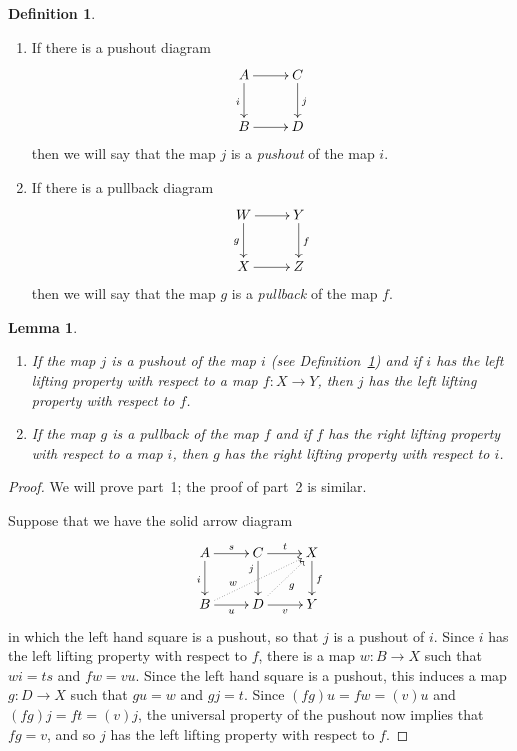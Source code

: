\documentclass[12pt]{amsart}
\numberwithin{equation}{section}
\theoremstyle{slplain}
\newtheorem{lem}[equation]{Lemma}
\theoremstyle{definition}
\newtheorem{defn}[equation]{Definition} %
\theoremstyle{remark}
\newcommand{\defref}{Definition~\ref}
\begin{document}
\begin{defn}
  \label{def:pushout}
  \leavevmode
  \begin{enumerate}
  \item If there is a pushout diagram
    \begin{displaymath}
      \xymatrix{
        {A} \ar[r] \ar[d]_{i}
        & {C} \ar[d]^{j}\\
        {B} \ar[r]
        & {D}
      }
    \end{displaymath}
    then we will say that the map $j$ is a \emph{pushout} of the map
    $i$.
  \item If there is a pullback diagram
    \begin{displaymath}
      \xymatrix{
        {W} \ar[r] \ar[d]_{g}
        & {Y} \ar[d]^{f}\\
        {X} \ar[r]
        & {Z}
      }
    \end{displaymath}
    then we will say that the map $g$ is a \emph{pullback} of the map
    $f$.
  \end{enumerate}
\end{defn}

\begin{lem}
  \label{lem:pushLLP}
  \leavevmode
  \begin{enumerate}
  \item If the map $j$ is a pushout of the map $i$ (see
    \defref{def:pushout}) and if $i$ has the left lifting property
    with respect to a map $f\colon X \to Y$, then $j$ has the left
    lifting property with respect to $f$.
  \item If the map $g$ is a pullback of the map $f$ and if $f$ has the
    right lifting property with respect to a map $i$, then $g$ has the
    right lifting property with respect to $i$.
  \end{enumerate}
\end{lem}

\begin{proof}
  We will prove part~1; the proof of part~2 is similar.

  Suppose that we have the solid arrow diagram
  \begin{displaymath}
    \xymatrix{
      {A} \ar[r]^{s} \ar[d]_{i}
      & {C} \ar[r]^{t} \ar[d]_(.3){j}
      & {X} \ar[d]^{f}\\
      {B} \ar[r]_{u} \ar@{..>}[urr]^(.3){w}
      & {D} \ar[r]_{v} \ar@{..>}[ur]_{g}
      & {Y}
    }
  \end{displaymath}
  in which the left hand square is a pushout, so that $j$ is a pushout
  of $i$.  Since $i$ has the left lifting property with respect to
  $f$, there is a map $w\colon B \to X$ such that $wi = ts$ and $fw =
  vu$.  Since the left hand square is a pushout, this induces a map
  $g\colon D \to X$ such that $gu = w$ and $gj = t$.  Since $(fg)u =
  fw = (v)u$ and $(fg)j = ft = (v)j$, the universal property of the
  pushout now implies that $fg = v$, and so $j$ has the left lifting
  property with respect to $f$.
\end{proof}
\end{document}
